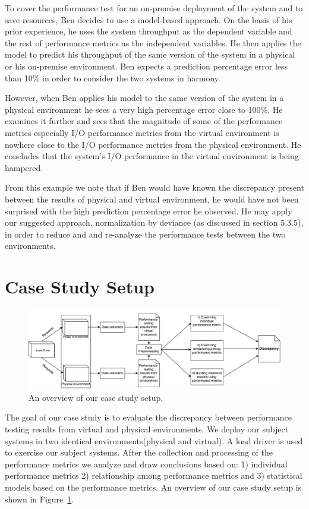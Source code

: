 \documentclass[smallextended]{svjour3}       %
\begin{document}
To cover the performance test for an on-premise deployment of the system and to save resources, Ben decides to use a model-based approach. On the basis of his prior experience, he uses the system throughput as the dependent variable and the rest of performance metrics as the independent variables. He then applies the model to predict his throughput of the same version of the system in a physical or his on-premise environment. Ben expects a prediction percentage error less than 10\% in order to consider the two systems in harmony.

However, when Ben applies his model to the same version of the system in a physical environment he sees a very high percentage error close to 100\%. He examines it further and sees that the magnitude of some of the performance metrics especially I/O performance metrics from the virtual environment is nowhere close to the I/O performance metrics from the physical environment. He concludes that the system's I/O performance in the virtual environment is being hampered.

From this example we note that if Ben would have known the discrepancy present between the results of physical and virtual environment, he would have not been surprised with the high prediction percentage error he observed. He may apply our suggested approach, normalization by deviance (as discussed in section 5.3.5), in order to reduce and and re-analyze the performance tests between the two environments.


\section{Case Study Setup}
\label{sec:case}

\begin{figure}[thb]
	\includegraphics[width=.9\textwidth]{overview}
	\caption{An overview of our case study setup.}
	\label{fig:Approach}
\end{figure}

The goal of our case study is to evaluate the discrepancy between performance testing results from virtual and physical environments. We deploy our subject systems in two identical environments(physical and virtual). A load driver is used to exercise our subject systems. After the collection and processing of the performance metrics we analyze and draw conclusions based on: 1) individual performance metrics 2) relationship among performance metrics and 3) statistical models based on the performance metrics. An overview of our case study setup is shown in Figure~\ref{fig:Approach}.
\end{document}
